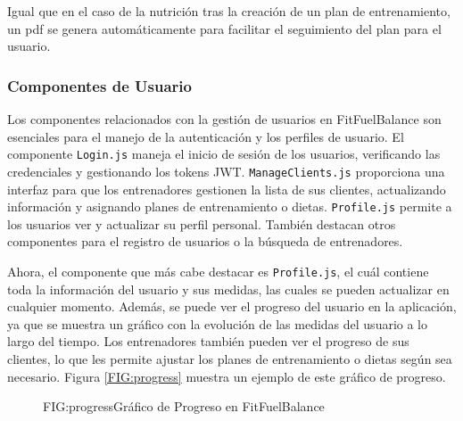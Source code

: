 Igual que en el caso de la nutrición tras la creación de un plan de entrenamiento, un pdf se genera automáticamente para facilitar el seguimiento del plan para el usuario.

\subsubsection{Componentes de Usuario}
Los componentes relacionados con la gestión de usuarios  en FitFuelBalance son esenciales para el manejo de la autenticación y los perfiles de usuario. El componente \texttt{Login.js} maneja el inicio de sesión de los usuarios, verificando las credenciales y gestionando los tokens JWT. \texttt{ManageClients.js} proporciona una interfaz para que los entrenadores gestionen la lista de sus clientes, actualizando información y asignando planes de entrenamiento o dietas. \texttt{Profile.js} permite a los usuarios ver y actualizar su perfil personal. También destacan otros componentes para el registro de usuarios o la búsqueda de entrenadores.

Ahora, el componente que más cabe destacar es \texttt{Profile.js}, el cuál contiene toda la información del usuario y sus medidas, las cuales se pueden actualizar en cualquier momento. Además, se puede ver el progreso del usuario en la aplicación, ya que se muestra un gráfico con la evolución de las medidas del usuario a lo largo del tiempo. Los entrenadores también pueden ver el progreso de sus clientes, lo que les permite ajustar los planes de entrenamiento o dietas según sea necesario. Figura \ref{FIG:progress} muestra un ejemplo de este gráfico de progreso.

\begin{figure}[Gráfico de Progreso]{FIG:progress}{Gráfico de Progreso en FitFuelBalance}
\end{figure}
